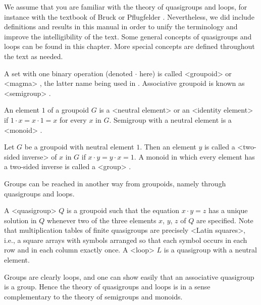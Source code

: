 
We assume that you are familiar with the theory of quasigroups and loops, for
instance with the textbook of Bruck \cite{Br} or Pflugfelder \cite{Pf}.
Nevertheless, we did include definitions and results in this manual in order to
unify the terminology and improve the intelligibility of the text. Some general
concepts of quasigroups and loops can be found in this chapter. More special
concepts are defined throughout the text as needed.


A set with one binary operation (denoted $\cdot$ here) is called
<groupoid>
%
%
 or <magma>
%
%
, the latter name being used in {\GAP}.
Associative groupoid is known as <semigroup>
%
%
.

An element $1$ of a groupoid $G$ is a <neutral element>
%
%
or an
<identity element>
%
%
 if $1\cdot x = x\cdot 1 = x$ for every $x$ in $G$.
Semigroup with a neutral element is a <monoid>
%
%
.

Let $G$ be a groupoid with neutral element $1$. Then an element $y$ is called a
<two-sided inverse>
%
%
 of $x$ in $G$ if $x\cdot y = y\cdot x = 1$. A monoid
in which every element has a two-sided inverse is called a <group>
%
%
.

Groups can be reached in another way from groupoids, namely through quasigroups
and loops.

A <quasigroup>
%
%
 $Q$ is a groupoid such that the equation $x\cdot y=z$ has a
unique solution in $Q$ whenever two of the three elements $x$, $y$, $z$ of $Q$
are specified. Note that multiplication tables of finite quasigroups are
precisely <Latin squares>, i.e., a square arrays with
symbols arranged so that each symbol occurs in each row and in each column
exactly once. A <loop>
%
%
 $L$ is a quasigroup with a neutral element.

Groups are clearly loops, and one can show easily that an associative
quasigroup is a group. Hence the theory of quasigroups and loops is in a sense
complementary to the theory of semigroups and monoids.


